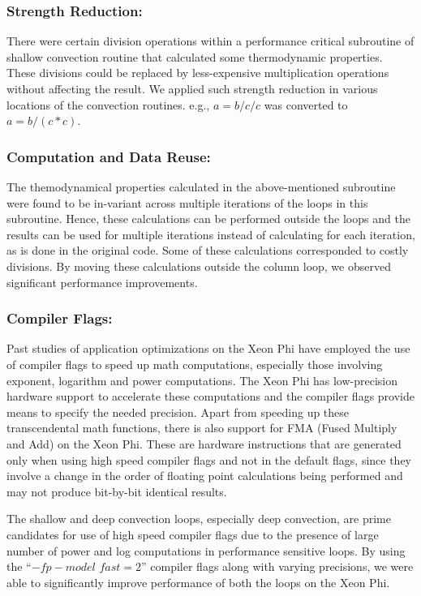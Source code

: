 \subsubsection{Strength Reduction:} There were certain division operations within a performance critical subroutine of shallow convection routine that calculated some thermodynamic properties. These divisions could be replaced by less-expensive multiplication operations without affecting the result. We applied such strength reduction in various locations of the convection routines. e.g., $a=b/c/c$ was converted to $a=b/(c*c)$.

\subsubsection{Computation and Data Reuse:} The themodynamical properties calculated in the above-mentioned subroutine were found to be in-variant across multiple iterations of the loops in this subroutine. Hence, these calculations can be performed outside the loops and the results can be used for multiple iterations instead of calculating for each iteration, as is done in the original code. Some of these calculations corresponded to costly divisions. By moving these calculations outside the column loop, we observed significant performance improvements.

\subsubsection{Compiler Flags:} Past studies of application optimizations on the Xeon Phi have employed the use of compiler flags to speed up math computations, especially those involving exponent, logarithm and power computations. The Xeon Phi has low-precision hardware support to accelerate these computations and the compiler flags provide means to specify the needed precision. Apart from speeding up these transcendental math functions, there is also support for FMA (Fused Multiply and Add) on the Xeon Phi.
These are hardware instructions that are generated only when using high speed compiler flags and not in the default flags, since they involve a change in the order of floating point calculations being performed and may not produce bit-by-bit identical results. 


The shallow and deep convection loops, especially deep convection, are prime candidates for use of high speed compiler flags due to the presence of large number of power and log computations in performance sensitive loops. By using the ``$-fp-model$ $fast=2$'' compiler flags along with varying precisions, we were able to significantly improve performance of both the loops on the Xeon Phi.




